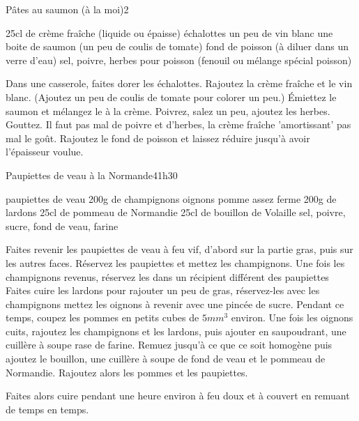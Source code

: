 \begin{recette}{Pâtes au saumon (à la moi)}{2}{}{}
\begin{ingredients}
\ingredient 25cl de crème fraîche (liquide ou épaisse)
 échalottes
\ingredient un peu de vin blanc
\ingredient une boite de saumon
\ingredient (un peu de coulis de tomate)
\ingredient fond de poisson (à diluer dans un verre d'eau)
\ingredient sel, poivre, herbes pour poisson (fenouil ou mélange spécial poisson)
\end{ingredients}

\begin{preparation}
\etape Dans une casserole, faites dorer les échalottes. 
\etape Rajoutez la crème fraîche et le vin blanc. (Ajoutez un peu de coulis de tomate pour colorer un peu.)
\etape Émiettez le saumon et mélangez le à la crème. Poivrez, salez un peu, ajoutez les herbes. Gouttez. Il faut pas mal de poivre et d'herbes, la crème fraîche 'amortissant' pas mal le goût.
\etape Rajoutez le fond de poisson et laissez réduire jusqu'à avoir l'épaisseur voulue.
\end{preparation}

\end{recette}

\begin{recette}{Paupiettes de veau à la Normande}{4}{1h30}{}
\begin{ingredients}
 paupiettes de veau
\ingredient 200g de champignons
 oignons
 pomme assez ferme
\ingredient 200g de lardons
\ingredient 25cl de pommeau de Normandie
\ingredient 25cl de bouillon de Volaille
\ingredient sel, poivre, sucre, fond de veau, farine
\end{ingredients}

\begin{preparation}
\etape Faites revenir les paupiettes de veau à feu vif, d'abord sur la partie gras, puis sur les autres faces. 
\etape Réservez les paupiettes et mettez les champignons.
\etape Une fois les champignons revenus, réservez les dans un récipient différent des paupiettes
\etape Faites cuire les lardons pour rajouter un peu de gras, réservez-les avec les champignons
\etape mettez les oignons à revenir avec une pincée de sucre. 
\etape Pendant ce temps, coupez les pommes en petits cubes de $5\unit{mm^3}$ environ. 
\etape Une fois les oignons cuits, rajoutez les champignons et les lardons, puis ajouter en saupoudrant, une cuillère à soupe rase de farine. Remuez jusqu'à ce que ce soit homogène puis ajoutez le bouillon, une cuillère à soupe de fond de veau et le pommeau de Normandie. 
\etape Rajoutez alors les pommes et les paupiettes.
\end{preparation}

\begin{cuisson}
Faites alors cuire pendant une heure environ à feu doux et à couvert en remuant de temps en temps.
\end{cuisson}


\end{recette}


